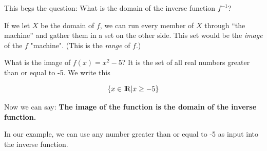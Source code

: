 This begs the question: What is the domain of the inverse function $f^{-1}$?

If we let $X$ be the domain of $f$, we can run every member of $X$
through ``the machine'' and gather them in a set on the other
side. This set would be the \textit{image} of the $f$ "machine". (This is the \textit{range} of $f$.)

What is the image of $f(x) = x^2 - 5$? It is the set of all real
numbers greater than or equal to -5. We write this

\begin{equation*}
  \{ x \in {\rm I\!R} | x \geq -5 \}
  \end{equation*}

Now we can say: \textbf{The image of the function is the domain
  of the inverse function.}

In our example, we can use any number greater
than or equal to -5 as input into the inverse function.




